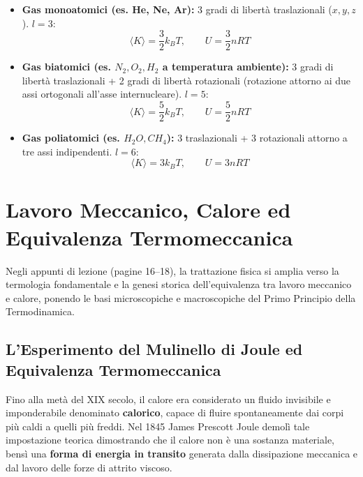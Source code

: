 \documentclass[11pt,a4paper,oneside]{report}
\begin{document}
\begin{itemize}
  \item \textbf{Gas monoatomici (es. He, Ne, Ar):} 3 gradi di libertà traslazionali ($x, y, z$). $l = 3$:
  \[
  \langle K \rangle = \frac{3}{2} k_B T, \qquad U = \frac{3}{2} n R T
  \]
  \item \textbf{Gas biatomici (es. $N_2, O_2, H_2$ a temperatura ambiente):} 3 gradi di libertà traslazionali + 2 gradi di libertà rotazionali (rotazione attorno ai due assi ortogonali all'asse internucleare). $l = 5$:
  \[
  \langle K \rangle = \frac{5}{2} k_B T, \qquad U = \frac{5}{2} n R T
  \]
  \item \textbf{Gas poliatomici (es. $H_2O, CH_4$):} 3 traslazionali + 3 rotazionali attorno a tre assi indipendenti. $l = 6$:
  \[
  \langle K \rangle = 3 k_B T, \qquad U = 3 n R T
  \]
\end{itemize}

\chapter{Lavoro Meccanico, Calore ed Equivalenza Termomeccanica}

Negli appunti di lezione (pagine 16--18), la trattazione fisica si amplia verso la termologia fondamentale e la genesi storica dell'equivalenza tra lavoro meccanico e calore, ponendo le basi microscopiche e macroscopiche del Primo Principio della Termodinamica.

\section{L'Esperimento del Mulinello di Joule ed Equivalenza Termomeccanica}
Fino alla met\`a del XIX secolo, il calore era considerato un fluido invisibile e imponderabile denominato \textbf{calorico}, capace di fluire spontaneamente dai corpi pi\`u caldi a quelli pi\`u freddi. Nel 1845 James Prescott Joule demol\`i tale impostazione teorica dimostrando che il calore non \`e una sostanza materiale, bens\`i una \textbf{forma di energia in transito} generata dalla dissipazione meccanica e dal lavoro delle forze di attrito viscoso.
\end{document}
